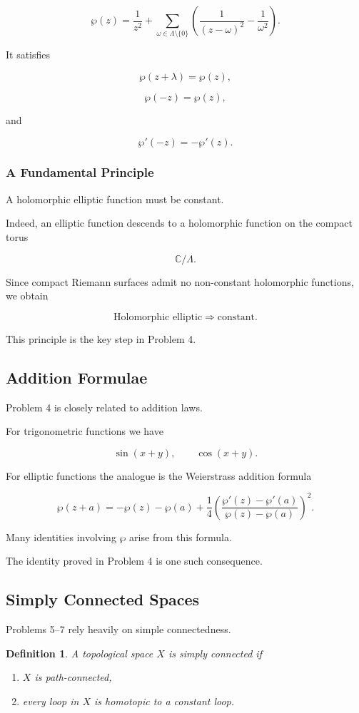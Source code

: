 \documentclass[12pt,a4paper]{article}
\theoremstyle{notespace}
\newtheorem{definition}{Definition}[subsection]
\begin{document}
\[
\wp(z)
=
\frac1{z^2}
+
\sum_{\omega\in\Lambda\setminus\{0\}}
\left(
\frac1{(z-\omega)^2}
-
\frac1{\omega^2}
\right).
\]

It satisfies

\[
\wp(z+\lambda)=\wp(z),
\]

\[
\wp(-z)=\wp(z),
\]

and

\[
\wp'(-z)=-\wp'(z).
\]

\subsubsection*{A Fundamental Principle}

A holomorphic elliptic function must be constant.

Indeed, an elliptic function descends to a holomorphic function on the compact torus

\[
\mathbb C/\Lambda.
\]

Since compact Riemann surfaces admit no non-constant holomorphic functions, we obtain

\[
\boxed{
	\text{Holomorphic elliptic}
	\Longrightarrow
	\text{constant}.
}
\]

This principle is the key step in Problem 4.

\subsection{Addition Formulae}

Problem 4 is closely related to addition laws.

For trigonometric functions we have

\[
\sin(x+y),
\qquad
\cos(x+y).
\]

For elliptic functions the analogue is the Weierstrass addition formula

\[
\wp(z+a)
=
-\wp(z)-\wp(a)
+
\frac14
\left(
\frac{\wp'(z)-\wp'(a)}
{\wp(z)-\wp(a)}
\right)^2.
\]

Many identities involving \(\wp\) arise from this formula.

The identity proved in Problem 4 is one such consequence.

\subsection{Simply Connected Spaces}

Problems 5--7 rely heavily on simple connectedness.

\begin{definition}
	A topological space \(X\) is \emph{simply connected} if
	
	\begin{enumerate}
		\item \(X\) is path-connected,
		\item every loop in \(X\) is homotopic to a constant loop.
	\end{enumerate}
\end{definition}
\end{document}
